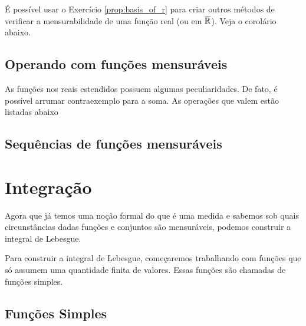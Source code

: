 É possível usar o Exercício \ref{prop:basis_of_r} para criar outros métodos de verificar a mensurabilidade de uma função real (ou em $\overline{\mathbb{R}}$). Veja o corolário abaixo.

\measurableFunctionsInRExtend

\constantFunction
\characteristicFunction

\subsection{Operando com funções mensuráveis}
\measurableFunctionsOperations

As funções nos reais estendidos possuem algumas peculiaridades. De fato, é possível arrumar contraexemplo para a soma. As operações que valem estão listadas abaixo

\measurableFunctionsOperationsRExtend

\measurableFunctionsNotation

\subsection{Sequências de funções mensuráveis}

\measurableFunctionsSequences











\section{Integração}

Agora que já temos uma noção formal do que é uma medida e sabemos sob quais circunstâncias dadas funções e conjuntos são mensuráveis, podemos construir a integral de Lebesgue.

Para construir a integral de Lebesgue, começaremos trabalhando com funções que só assumem uma quantidade finita de valores. Essas funções são chamadas de funções simples.

\subsection{Funções Simples}

